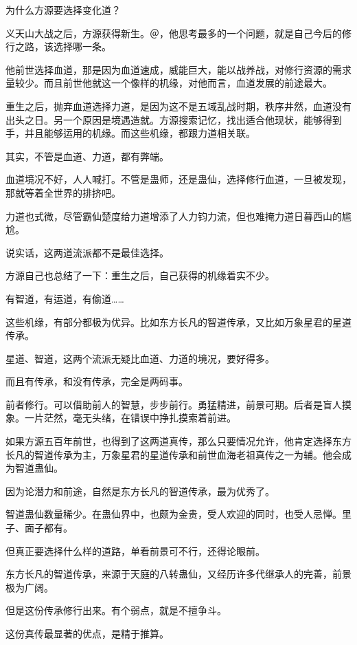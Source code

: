 
\begin{this_body}

为什么方源要选择变化道？

义天山大战之后，方源获得新生。＠，他思考最多的一个问题，就是自己今后的修行之路，该选择哪一条。

他前世选择血道，那是因为血道速成，威能巨大，能以战养战，对修行资源的需求量较少。而且前世他就这一个像样的机缘，对他而言，血道发展的前途最大。

重生之后，抛弃血道选择力道，是因为这不是五域乱战时期，秩序井然，血道没有出头之日。另一个原因是境遇造就。方源搜索记忆，找出适合他现状，能够得到手，并且能够运用的机缘。而这些机缘，都跟力道相关联。

其实，不管是血道、力道，都有弊端。

血道境况不好，人人喊打。不管是蛊师，还是蛊仙，选择修行血道，一旦被发现，那就等着全世界的排挤吧。

力道也式微，尽管霸仙楚度给力道增添了人力钧力流，但也难掩力道日暮西山的尴尬。

说实话，这两道流派都不是最佳选择。

方源自己也总结了一下：重生之后，自己获得的机缘着实不少。

有智道，有运道，有偷道……

这些机缘，有部分都极为优异。比如东方长凡的智道传承，又比如万象星君的星道传承。

星道、智道，这两个流派无疑比血道、力道的境况，要好得多。

而且有传承，和没有传承，完全是两码事。

前者修行。可以借助前人的智慧，步步前行。勇猛精进，前景可期。后者是盲人摸象。一片茫然，毫无头绪，在错误中挣扎摸索着前进。

如果方源五百年前世，也得到了这两道真传，那么只要情况允许，他肯定选择东方长凡的智道传承为主，万象星君的星道传承和前世血海老祖真传之一为辅。他会成为智道蛊仙。

因为论潜力和前途，自然是东方长凡的智道传承，最为优秀了。

智道蛊仙数量稀少。在蛊仙界中，也颇为金贵，受人欢迎的同时，也受人忌惮。里子、面子都有。

但真正要选择什么样的道路，单看前景可不行，还得论眼前。

东方长凡的智道传承，来源于天庭的八转蛊仙，又经历许多代继承人的完善，前景极为广阔。

但是这份传承修行出来。有个弱点，就是不擅争斗。

这份真传最显著的优点，是精于推算。


\end{this_body}
